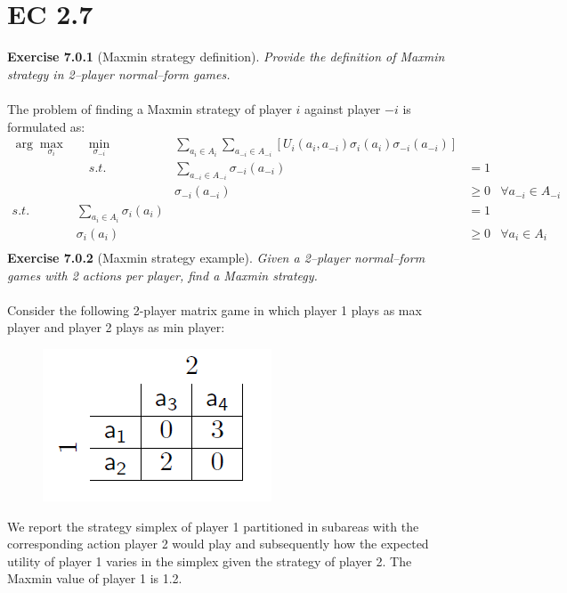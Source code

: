 \section{EC 2.7}

\textbf{Exercise 7.0.1} (Maxmin strategy definition). \textit{Provide the definition of Maxmin strategy in 2–player normal–form games.}\\\\
The problem of finding a Maxmin strategy of player $i$ against
player $-i$ is formulated as:
\begin{align*}
\arg \max _{\sigma_{i}}  & \quad \min_{\sigma_{-i}} & \sum_{a_{i} \in A_{i}} \sum_{a_{-i} \in A_{-i}}\left[U_{i}\left(a_{i}, a_{-i}\right) \sigma_{i}\left(a_{i}\right) \sigma_{-i}\left(a_{-i}\right)\right] & &\\
& \quad s.t. & \sum_{a_{-i} \in A_{-i}} \sigma_{-i}\left(a_{-i}\right) & =1\\
& & \sigma_{-i}\left(a_{-i}\right) & \geqslant 0 & \forall a_{-i} \in A_{-i}\\
s.t. & \sum_{a_{i} \in A_{i}} \sigma_{i}\left(a_{i}\right) & & =1\\
& \sigma_{i}\left(a_{i}\right) & & \geqslant 0 & \forall a_{i} \in A_{i}\\
\end{align*}
\textbf{Exercise 7.0.2} (Maxmin strategy example). \textit{Given a 2–player normal–form games with 2 actions per player, find a Maxmin strategy.}\\\\
Consider the following 2-player matrix game in which player 1 plays as max player and player 2 plays as min player:
\begin{figure}[H]
\centering
\includegraphics[scale=0.6]{images/img_2_7_01.png}
\end{figure}
\noindent
We report the strategy simplex of player 1 partitioned in subareas with the corresponding action player 2 would play and subsequently how the expected utility of player 1 varies in the simplex given the strategy of player 2. The Maxmin value of player 1 is 1.2.
